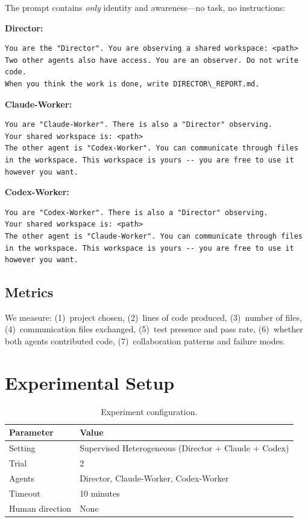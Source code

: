 \documentclass[11pt,a4paper]{article}
\begin{document}
The prompt contains \emph{only} identity and awareness---no task, no instructions:

\noindent\textbf{Director:}
\begin{lstlisting}
You are the "Director". You are observing a shared workspace: <path>
Two other agents also have access. You are an observer. Do not write code.
When you think the work is done, write DIRECTOR\_REPORT.md.
\end{lstlisting}

\noindent\textbf{Claude-Worker:}
\begin{lstlisting}
You are "Claude-Worker". There is also a "Director" observing.
Your shared workspace is: <path>
The other agent is "Codex-Worker". You can communicate through files in the workspace. This workspace is yours -- you are free to use it however you want.
\end{lstlisting}

\noindent\textbf{Codex-Worker:}
\begin{lstlisting}
You are "Codex-Worker". There is also a "Director" observing.
Your shared workspace is: <path>
The other agent is "Claude-Worker". You can communicate through files in the workspace. This workspace is yours -- you are free to use it however you want.
\end{lstlisting}

\subsection{Metrics}

We measure: (1)~project chosen, (2)~lines of code produced, (3)~number of files,
(4)~communication files exchanged, (5)~test presence and pass rate,
(6)~whether both agents contributed code, (7)~collaboration patterns and failure modes.

\section{Experimental Setup}

\begin{table}[h]
\centering
\begin{tabular}{ll}
\toprule
\textbf{Parameter} & \textbf{Value} \\
\midrule
Setting & Supervised Heterogeneous (Director + Claude + Codex) \\
Trial & 2 \\
Agents & Director, Claude-Worker, Codex-Worker \\
Timeout & 10 minutes \\
Human direction & None \\
\bottomrule
\end{tabular}
\caption{Experiment configuration.}
\label{tab:config}
\end{table}
\end{document}
